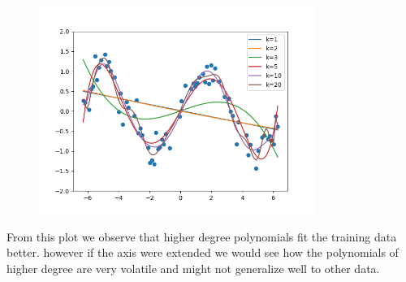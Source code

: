\begin{answer}
\begin{figure}[H]
    \centering
    \includegraphics[width=9cm]{featuremaps/plot.png}
\end{figure}
From this plot we observe that higher degree polynomials fit the training data better. however if the axis were extended we would see how the polynomials of higher degree are very volatile and might not generalize well to other data.
\end{answer}
